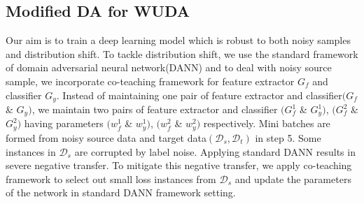 \subsection{Modified DA for WUDA}
Our aim is to train a deep learning model which is robust to both noisy samples and distribution shift. To tackle distribution shift, we use the standard framework of domain adversarial neural network(DANN) and to deal with noisy source sample, we incorporate co-teaching framework for feature extractor $G_f$ and classifier $G_y$. 
Instead of maintaining one pair of feature extractor and classifier$(G_f$ \& $G_y)$, we maintain two pairs of feature extractor and classifier $(G_{f}^1$ \& $G_{y}^1)$, $(G_{f}^2$ \& $G_{y}^2)$ having parameters $(w_{f}^1$ \& $w_{y}^1)$, $(w_{f}^2$ \& $w_{y}^2)$ respectively. Mini batches are formed from noisy source data and target data$(\mathcal{D}_s, \mathcal{D}_t)$ in step 5. Some instances in $\mathcal{D}_s$ are corrupted by label noise. Applying standard DANN results in severe negative transfer. To mitigate this negative transfer, we apply co-teaching framework to select out small loss instances from $\mathcal{D}_s$ and update the parameters of the network in standard DANN framework setting.



